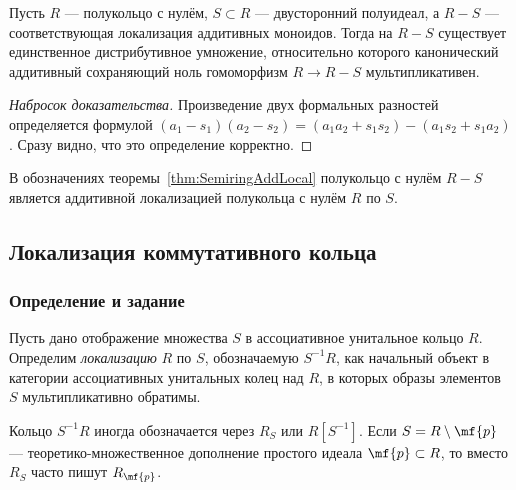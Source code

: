 \documentclass[
	extrafontsizes,
	11pt,
	hyphens,
]{memoir}
\begin{document}
\begin{theorem}
Пусть \(R\) --- полукольцо с нулём, \(S \subset R\) --- двусторонний полуидеал, а \(R - S\) --- соответствующая локализация аддитивных моноидов.
\label{thm:SemiringAddLocal}
Тогда на \(R - S\) существует единственное дистрибутивное умножение, относительно которого канонический аддитивный сохраняющий ноль гомоморфизм \(R \to R - S\) мультипликативен.
\end{theorem}

\begin{proof}[Набросок доказательства]
Произведение двух формальных разностей определяется формулой \((a_1 - s_1)(a_2 - s_2) = (a_1 a_2 + s_1 s_2) - (a_1 s_2 + s_1 a_2)\). Сразу видно, что это определение корректно.
\end{proof}

\begin{observation}
В обозначениях теоремы~\ref{thm:SemiringAddLocal}
полукольцо с нулём \(R - S\)
является аддитивной локализацией полукольца с нулём \(R\) по \(S\).
\end{observation}

\subsection{Локализация коммутативного кольца}

\subsubsection{Определение и задание}

\begin{definition}[\scshape Локализация кольца]
Пусть дано отображение множества \(S\) в ассоциативное унитальное кольцо \(R\).
Определим \emph{локализацию} \(R\) по \(S\), обозначаемую \(S^{-1}R\), как начальный объект в категории ассоциативных унитальных колец над \(R\), в которых образы элементов \(S\) мультипликативно обратимы.
\end{definition}

\begin{remark}
Кольцо \(S^{-1}R\) иногда обозначается через \(R_S\) или \(R[S^{-1}]\).
Если \(S = R \setminus \mf{p}\)
--- теоретико-множественное дополнение простого идеала \(\mf{p} \subset R\),
то вместо \(R_S\) часто пишут \(R_\mf{p}\).
\end{remark}
\end{document}
